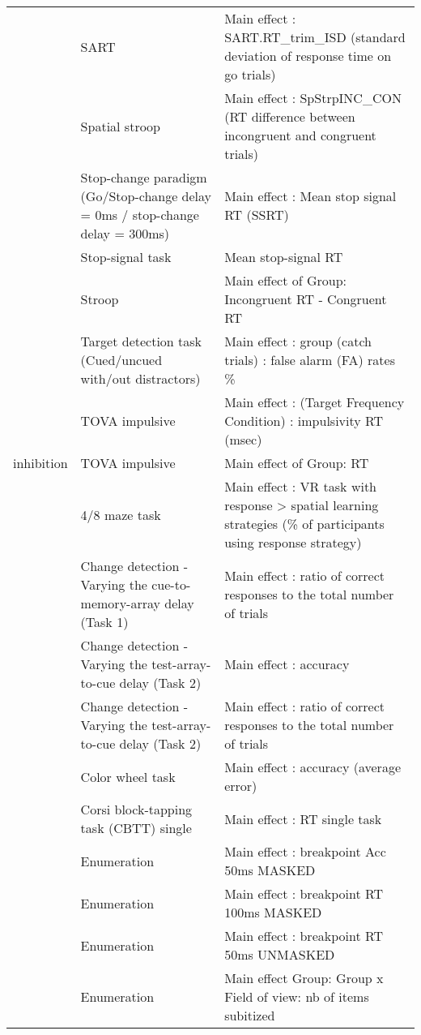 \documentclass[
]{book}
\begin{document}
\begin{tabular}{l|l|l}
\cline{2-3}
 & SART & Main effect : SART.RT\_trim\_ISD (standard deviation of response time on go trials)\\
\cline{2-3}
 & Spatial stroop & Main effect : SpStrpINC\_CON (RT difference between incongruent and congruent trials)\\
\cline{2-3}
 & Stop-change paradigm (Go/Stop-change delay = 0ms / stop-change delay = 300ms) & Main effect : Mean stop signal RT (SSRT)\\
\cline{2-3}
 & Stop-signal task & Mean stop-signal RT\\
\cline{2-3}
 & Stroop & Main effect of Group: Incongruent RT - Congruent RT\\
\cline{2-3}
 & Target detection task (Cued/uncued with/out distractors) & Main effect : group (catch trials) : false alarm (FA) rates \%\\
\cline{2-3}
 & TOVA impulsive & Main effect : (Target Frequency Condition) : impulsivity RT (msec)\\
\cline{2-3}
\multirow[t]{-10}{*}{\raggedright\arraybackslash inhibition} & TOVA impulsive & Main effect of Group: RT\\
\cline{1-3}
 & 4/8 maze task & Main effect : VR task with response > spatial learning strategies (\% of participants using response strategy)\\
\cline{2-3}
 & Change detection - Varying the cue-to-memory-array delay (Task 1) & Main effect : ratio of correct responses to the total number of trials\\
\cline{2-3}
 & Change detection - Varying the test-array-to-cue delay (Task 2) & Main effect : accuracy\\
\cline{2-3}
 & Change detection - Varying the test-array-to-cue delay (Task 2) & Main effect : ratio of correct responses to the total number of trials\\
\cline{2-3}
 & Color wheel task & Main effect : accuracy (average error)\\
\cline{2-3}
 & Corsi block-tapping task (CBTT) single & Main effect : RT single task\\
\cline{2-3}
 & Enumeration & Main effect : breakpoint Acc 50ms MASKED\\
\cline{2-3}
 & Enumeration & Main effect : breakpoint RT 100ms MASKED\\
\cline{2-3}
 & Enumeration & Main effect : breakpoint RT 50ms UNMASKED\\
\cline{2-3}
 & Enumeration & Main effect Group: Group x Field of view: nb of items subitized\\

\end{tabular}
\end{document}

